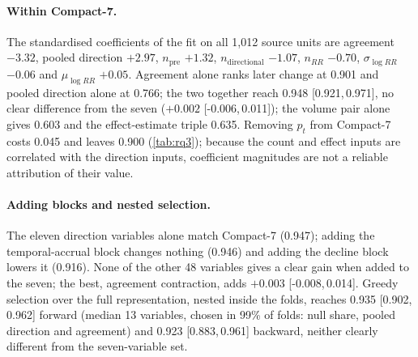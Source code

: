 \documentclass[11pt]{article}
\newcommand{\compact}{Compact-7\xspace}
\newcommand{\ci}[2]{[#1,\,#2]}
\begin{document}
\paragraph{Within \compact.} The standardised coefficients of the fit on all 1{,}012 source units are agreement
$-3.32$, pooled direction $+2.97$, $n_{\text{pre}}$ $+1.32$, $n_{\text{directional}}$ $-1.07$,
$n_{RR}$ $-0.70$, $\sigma_{\log RR}$ $-0.06$ and $\mu_{\log RR}$ $+0.05$. Agreement alone ranks later
change at 0.901 and pooled direction alone at 0.766; the two together reach 0.948 \ci{0.921}{0.971},
no clear difference from the seven ($+0.002$ \ci{-0.006}{0.011}); the volume pair alone gives 0.603
and the effect-estimate triple 0.635. Removing $p_t$ from \compact costs 0.045 and leaves 0.900 (\cref{tab:rq3}); because the
count and effect inputs are correlated with the direction inputs, coefficient magnitudes are not a
reliable attribution of their value.

\paragraph{Adding blocks and nested selection.} The eleven direction variables alone match \compact
(0.947); adding the temporal-accrual block changes nothing (0.946) and adding the decline block
lowers it (0.916). None of the other 48 variables gives a clear gain when added to the seven; the
best, agreement contraction, adds $+0.003$ \ci{-0.008}{0.014}. Greedy selection over the full
representation, nested inside the folds, reaches 0.935 \ci{0.902}{0.962} forward (median 13
variables, chosen in 99\% of folds: null share, pooled direction and agreement) and 0.923
\ci{0.883}{0.961} backward, neither clearly different from the seven-variable set.
\end{document}
